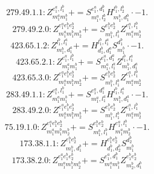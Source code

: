 \documentclass[letterpaper,10pt,fleqn,leqno,onecolumn]{article}
\begin{document}
\begin{equation} \;\;\;\;\;\;  279.49.1.1: Z^{e_{1}^{a},l_{1}^{b}}_{m_{1}^{a}m_{1}^{b}}+=S^{e_{1}^{a},d_{1}^{b}}_{m_{1}^{a},l_{2}^{b}}H^{l_{1}^{b},l_{2}^{b}}_{m_{1}^{b},d_{1}^{b}}\cdot -1. \end{equation}
\begin{equation} \;\;\;\;\;\;  279.49.2.0: Z^{e_{1}^{a}e_{1}^{b}e_{2}^{b}}_{m_{1}^{a}m_{1}^{b}m_{2}^{b}}+=S^{e_{1}^{b}e_{2}^{b}}_{m_{1}^{b},l_{1}^{b}}Z^{e_{1}^{a},l_{1}^{b}}_{m_{1}^{a}m_{2}^{b}} \end{equation}
\begin{equation} \;\;\;\;\;\;  423.65.1.2: Z^{l_{1}^{b},l_{1}^{a}}_{m_{1}^{b},d_{1}^{a}}+=H^{l_{1}^{b},l_{1}^{a}}_{d_{1}^{b},d_{1}^{a}}S^{d_{1}^{b}}_{m_{1}^{b}}\cdot -1. \end{equation}
\begin{equation} \;\;\;\;\;\;  423.65.2.1: Z^{e_{1}^{a},l_{1}^{b}}_{m_{1}^{a}m_{1}^{b}}+=S^{e_{1}^{a},d_{1}^{a}}_{m_{1}^{a},l_{1}^{a}}Z^{l_{1}^{b},l_{1}^{a}}_{m_{1}^{b},d_{1}^{a}} \end{equation}
\begin{equation} \;\;\;\;\;\;  423.65.3.0: Z^{e_{1}^{a}e_{1}^{b}e_{2}^{b}}_{m_{1}^{a}m_{1}^{b}m_{2}^{b}}+=S^{e_{1}^{b}e_{2}^{b}}_{m_{1}^{b},l_{1}^{b}}Z^{e_{1}^{a},l_{1}^{b}}_{m_{1}^{a}m_{2}^{b}} \end{equation}
\begin{equation} \;\;\;\;\;\;  283.49.1.1: Z^{e_{1}^{a},l_{1}^{b}}_{m_{1}^{a}m_{1}^{b}}+=S^{e_{1}^{a},d_{1}^{a}}_{m_{1}^{a},l_{1}^{a}}H^{l_{1}^{b},l_{1}^{a}}_{m_{1}^{b},d_{1}^{a}}\cdot -1. \end{equation}
\begin{equation} \;\;\;\;\;\;  283.49.2.0: Z^{e_{1}^{a}e_{1}^{b}e_{2}^{b}}_{m_{1}^{a}m_{1}^{b}m_{2}^{b}}+=S^{e_{1}^{b}e_{2}^{b}}_{m_{1}^{b},l_{1}^{b}}Z^{e_{1}^{a},l_{1}^{b}}_{m_{1}^{a}m_{2}^{b}} \end{equation}
\begin{equation} \;\;\;\;\;\;  75.19.1.0: Z^{e_{1}^{a}e_{1}^{b}e_{2}^{b}}_{m_{1}^{a}m_{1}^{b}m_{2}^{b}}+=S^{e_{1}^{b}e_{2}^{b}}_{m_{1}^{b},l_{1}^{b}}H^{e_{1}^{a},l_{1}^{b}}_{m_{1}^{a}m_{2}^{b}}\cdot -1. \end{equation}
\begin{equation} \;\;\;\;\;\;  173.38.1.1: Z^{e_{1}^{b}e_{2}^{b}}_{m_{1}^{b},d_{1}^{b}}+=H^{e_{1}^{b}e_{2}^{b}}_{d_{1}^{b},d_{2}^{b}}S^{d_{2}^{b}}_{m_{1}^{b}} \end{equation}
\begin{equation} \;\;\;\;\;\;  173.38.2.0: Z^{e_{1}^{a}e_{1}^{b}e_{2}^{b}}_{m_{1}^{a}m_{1}^{b}m_{2}^{b}}+=S^{e_{1}^{a},d_{1}^{b}}_{m_{1}^{a}m_{1}^{b}}Z^{e_{1}^{b}e_{2}^{b}}_{m_{2}^{b},d_{1}^{b}} \end{equation}
\end{document}
